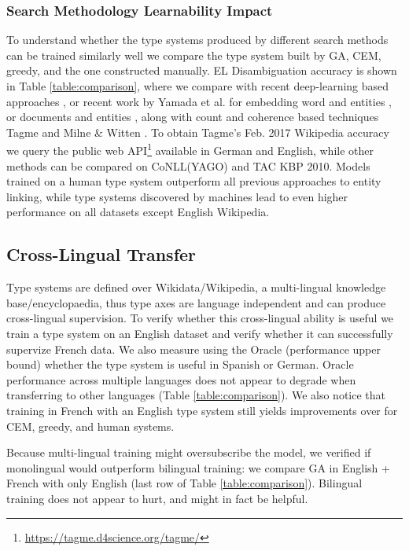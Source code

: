 \documentclass[letterpaper]{article}
\begin{document}
\subsubsection{Search Methodology Learnability Impact}
To understand whether the type systems produced by different search methods can be trained similarly well we compare the type system built by GA, CEM, greedy, and the one constructed manually. EL Disambiguation accuracy is shown in Table \ref{table:comparison}, where we compare with recent deep-learning based approaches \cite{globerson2016collective}, or recent work by Yamada et al. for embedding word and entities \cite{yamada2016joint}, or documents and entities \cite{yamada2017learning}, along with count and coherence based techniques Tagme \cite{tagme} and Milne \& Witten \cite{milne2008learning}. To obtain Tagme's Feb. 2017 Wikipedia accuracy we query the public web API\footnote{\url{https://tagme.d4science.org/tagme/}} available in German and English, while other methods can be compared on CoNLL(YAGO) and TAC KBP 2010. Models trained on a human type system outperform all previous approaches to entity linking, while type systems discovered by machines lead to even higher performance on all datasets except English Wikipedia.

\subsection{Cross-Lingual Transfer}
Type systems are defined over Wikidata/Wikipedia, a multi-lingual knowledge base/encyclopaedia, thus type axes are language independent and can produce cross-lingual supervision. To verify whether this cross-lingual ability is useful we train a type system on an English dataset and verify whether it can successfully supervize French data. We also measure using the Oracle (performance upper bound) whether the type system is useful in Spanish or German. Oracle performance across multiple languages does not appear to degrade when transferring to other languages (Table \ref{table:comparison}). We also notice that training in French with an English type system still yields improvements over  for CEM, greedy, and human systems.

Because multi-lingual training might oversubscribe the model, we verified if monolingual would outperform bilingual training: we compare GA in English + French with only English (last row of Table \ref{table:comparison}). Bilingual training does not appear to hurt, and might in fact be helpful.
\end{document}
